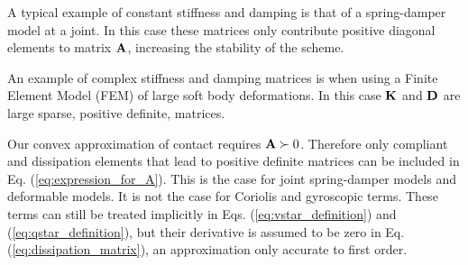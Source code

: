 A typical example of constant stiffness and damping is that of a spring-damper
model at a joint. In this case these matrices only contribute positive diagonal
elements to matrix ${\mathbf{A}}$, increasing the stability of the scheme.

An example of complex stiffness and damping matrices is when using a Finite
Element Model (FEM) of large soft body deformations. In this case ${\mathbf{K}}$ and
${\mathbf{D}}$ are large sparse, positive definite, matrices.

Our convex approximation of contact requires ${\mathbf{A}}\succ 0$. Therefore only
compliant and dissipation elements that lead to positive definite matrices can
be included in Eq. (\ref{eq:expression_for_A}). This is the case for joint
spring-damper models and deformable models. It is not the case for Coriolis and
gyroscopic terms. These terms can still be treated implicitly in Eqs.
(\ref{eq:vstar_definition}) and (\ref{eq:qstar_definition}), but their
derivative is assumed to be zero in Eq. (\ref{eq:dissipation_matrix}), an
approximation only accurate to first order.

